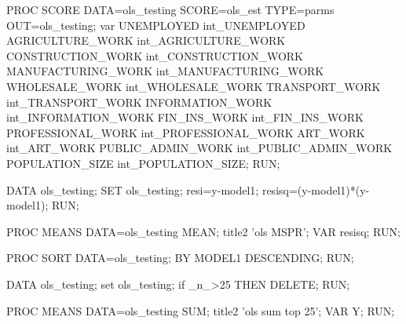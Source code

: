 \begin{SAScode}
PROC SCORE DATA=ols_testing SCORE=ols_est TYPE=parms OUT=ols_testing;
var UNEMPLOYED int_UNEMPLOYED
AGRICULTURE_WORK int_AGRICULTURE_WORK
CONSTRUCTION_WORK int_CONSTRUCTION_WORK
MANUFACTURING_WORK int_MANUFACTURING_WORK
WHOLESALE_WORK int_WHOLESALE_WORK
TRANSPORT_WORK int_TRANSPORT_WORK
INFORMATION_WORK int_INFORMATION_WORK
FIN_INS_WORK int_FIN_INS_WORK
PROFESSIONAL_WORK int_PROFESSIONAL_WORK
ART_WORK int_ART_WORK
PUBLIC_ADMIN_WORK int_PUBLIC_ADMIN_WORK
POPULATION_SIZE int_POPULATION_SIZE;
RUN;


DATA ols_testing;
SET ols_testing;
resi=y-model1;
resisq=(y-model1)*(y-model1);
RUN;

PROC MEANS DATA=ols_testing MEAN;
title2 'ols MSPR';
VAR resisq;
RUN;

PROC SORT DATA=ols_testing;
BY MODEL1 DESCENDING;
RUN;

DATA ols_testing;
set ols_testing;
if _n_>25 THEN DELETE;
RUN;

PROC MEANS DATA=ols_testing SUM;
title2 'ols sum top 25';
VAR Y;
RUN;

\end{SAScode}